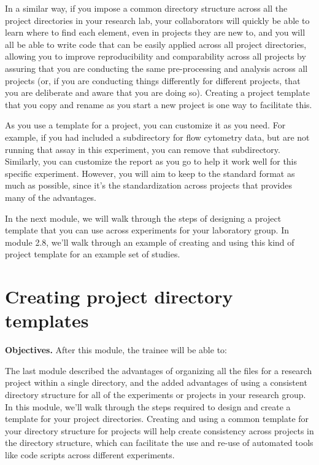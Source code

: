 \documentclass[]{tufte-book}
\begin{document}
In a similar way, if you impose a common directory structure across all the
project directories in your research lab, your collaborators will quickly be
able to learn where to find each element, even in projects they are new to, and
you will all be able to write code that can be easily applied across all project
directories, allowing you to improve reproducibility and comparability across
all projects by assuring that you are conducting the same pre-processing and
analysis across all projects (or, if you are conducting things differently for
different projects, that you are deliberate and aware that you are doing so).
Creating a project template that you copy and rename as you start a new
project is one way to facilitate this.

As you use a template for a project, you can customize it as you need. For
example, if you had included a subdirectory for flow cytometry data, but are not
running that assay in this experiment, you can remove that subdirectory.
Similarly, you can customize the report as you go to help it work well for this
specific experiment. However, you will aim to keep to the standard format as
much as possible, since it's the standardization across projects that provides
many of the advantages.

In the next module, we will walk through the steps of designing a project
template that you can use across experiments for your laboratory group. In
module 2.8, we'll walk through an example of creating and using this kind of
project template for an example set of studies.

\section{Creating project directory templates}\label{module7}

\textbf{Objectives.} After this module, the trainee will be able to:

The last module described the advantages of organizing all the files for a
research project within a single directory, and the added advantages of using a
consistent directory structure for all of the experiments or projects in your
research group. In this module, we'll walk through the steps required to design
and create a template for your project directories. Creating and using a common
template for your directory structure for projects will help create consistency
across projects in the directory structure, which can facilitate the use and
re-use of automated tools like code scripts across different experiments.
\end{document}
